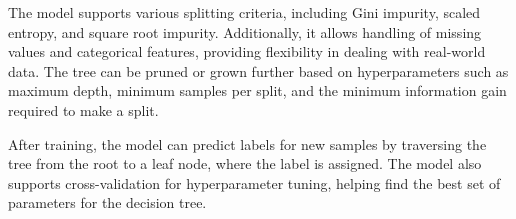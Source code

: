 \documentclass{article}
\begin{document}
The model supports various splitting criteria, including Gini impurity, scaled entropy, and square root impurity. Additionally, it allows handling of missing values and categorical features, providing flexibility in dealing with real-world data. The tree can be pruned or grown further based on hyperparameters such as maximum depth, minimum samples per split, and the minimum information gain required to make a split.

After training, the model can predict labels for new samples by traversing the tree from the root to a leaf node, where the label is assigned. The model also supports cross-validation for hyperparameter tuning, helping find the best set of parameters for the decision tree.
\end{document}
